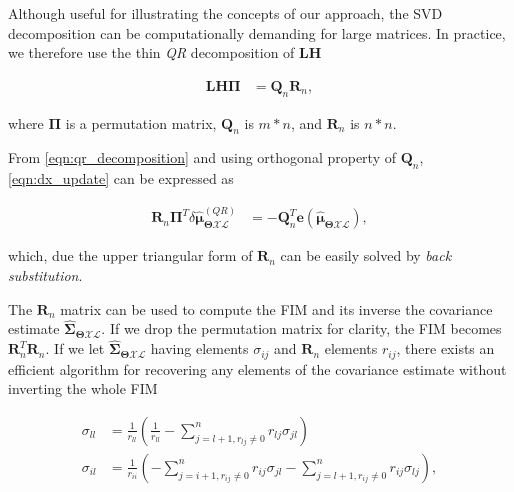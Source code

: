 Although useful for illustrating the concepts of our approach, the SVD
decomposition can be computationally demanding for large matrices. In practice,
we therefore use the thin \emph{QR} decomposition of $\mathbf{L}\mathbf{H}$

\begin{equation}\label{eqn:qr_decomposition}
  \begin{aligned}
  \mathbf{L}\mathbf{H}\boldsymbol{\Pi} &= \mathbf{Q}_n\mathbf{R}_n,
  \end{aligned}
\end{equation}

where $\boldsymbol{\Pi}$ is a permutation matrix, $\mathbf{Q}_n$ is $m*n$, and
$\mathbf{R}_n$ is $n*n$.

From \eqref{eqn:qr_decomposition} and using orthogonal property of
$\mathbf{Q}_n$, \eqref{eqn:dx_update} can be expressed as

\begin{equation}\label{eqn:dx_qr_solve}
  \begin{aligned}
  \mathbf{R}_n\boldsymbol{\Pi}^{T}
    \delta\hat{\boldsymbol{\mu}}_{\boldsymbol{\Theta}\mathcal{X}\mathcal{L}}^
    {(QR)}&=
    -\mathbf{Q}_n^T \mathbf{e}(
    \mathbf{\hat{\boldsymbol{\mu}}_{
    \boldsymbol{\Theta}\mathcal{X}\mathcal{L}}}),
  \end{aligned}
\end{equation}

which, due the upper triangular form of $\mathbf{R}_n$ can be easily solved by
\emph{back substitution}.

The $\mathbf{R}_n$ matrix can be used to compute the FIM and its
inverse the covariance estimate
$\hat{\boldsymbol{\Sigma}}_{\boldsymbol{\Theta}\mathcal{X}\mathcal{L}}$. If we
drop the permutation matrix for clarity, the FIM becomes
$\mathbf{R}_n^T\mathbf{R}_n$. If we let
$\hat{\boldsymbol{\Sigma}}_{\boldsymbol{\Theta}\mathcal{X}\mathcal{L}}$ having
elements $\sigma_{ij}$ and $\mathbf{R}_n$ elements $r_{ij}$, there exists an
efficient algorithm for recovering any elements of the covariance estimate
without inverting the whole FIM

\begin{equation}\label{eqn:covariance_QR}
  \begin{aligned}
  \sigma_{ll} &= \frac{1}{r_{ll}}(\frac{1}{r_{ll}} -
    \sum_{j = l + 1, r_{lj}\neq 0}^n r_{lj}\sigma_{jl})\\
  \sigma_{il} &= \frac{1}{r_{ii}}
    (-\sum_{j = i + 1, r_{ij}\neq 0}^n r_{ij}\sigma_{jl} -
    \sum_{j = l + 1, r_{ij}\neq 0}^n r_{ij}\sigma_{lj}),
  \end{aligned}
\end{equation}

